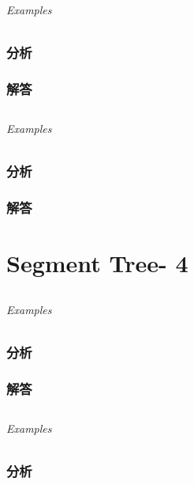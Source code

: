 \documentclass[UTF8,a4paper,12pt]{ctexbook}
\begin{document}
	\subparagraph{Examples}
	
	\subsection{分析}
	
	\subsection{解答}
	
\section{}
	
	\subparagraph{Examples}
	
	\subsection{分析}
	
	\subsection{解答}
	
\chapter{Segment Tree- 4}
\section{}
	
	\subparagraph{Examples}
	
	\subsection{分析}
	
	\subsection{解答}
	
\section{}
	
	\subparagraph{Examples}
	
	\subsection{分析}
	
\end{document}
